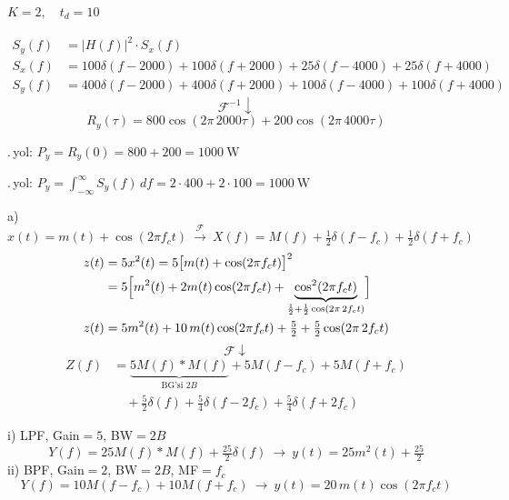 \documentclass[11pt,a4paper]{article}
\begin{document}
\noindent $K=2,\quad t_d=10$

\noindent
{}
\begin{align*}
S_y(f)&=|H(f)|^2\cdot S_x(f)\\
S_x(f)&=100\delta(f-2000)+100\delta(f+2000)+25\delta(f-4000)+25\delta(f+4000)\\
S_y(f)&=400\delta(f-2000)+400\delta(f+2000)+100\delta(f-4000)+100\delta(f+4000)
\end{align*}
\[ \mathcal{F}^{-1}\downarrow \]
\[ R_y(\tau)=800\cos(2\pi\,2000\tau)+200\cos(2\pi\,4000\tau) \]

.\,yol: $P_y=R_y(0)=800+200=1000\ \mathrm{W}$

.\,yol: $P_y=\displaystyle\int_{-\infty}^{\infty}S_y(f)\,df=2\cdot400+2\cdot100=1000\ \mathrm{W}$


\noindent a)
\[
x(t)=m(t)+\cos(2\pi f_c t)\ \xrightarrow{\ \mathcal{F}\ }\ X(f)=M(f)+\tfrac12\delta(f-f_c)+\tfrac12\delta(f+f_c)
\]
\begin{align*}
z(t)&=5x^2(t)=5\bigl[m(t)+\cos(2\pi f_c t)\bigr]^2\\
 &=5\Bigl[m^2(t)+2m(t)\cos(2\pi f_c t)+\underbrace{\cos^2(2\pi f_c t)}_{\frac12+\frac12\cos(2\pi\,2f_c t)}\Bigr]\\
z(t)&=5m^2(t)+10\,m(t)\cos(2\pi f_c t)+\tfrac52+\tfrac52\cos(2\pi\,2f_c t)
\end{align*}
\[ \mathcal{F}\downarrow \]
\begin{align*}
Z(f)&=\underbrace{5M(f)\ast M(f)}_{\text{BG'si } 2B}+5M(f-f_c)+5M(f+f_c)\\
 &\quad+\tfrac52\delta(f)+\tfrac54\delta(f-2f_c)+\tfrac54\delta(f+2f_c)
\end{align*}

\noindent i) LPF, Gain$=5$, BW$=2B$
\[
Y(f)=25M(f)\ast M(f)+\tfrac{25}{2}\delta(f)\ \longrightarrow\ y(t)=25m^2(t)+\tfrac{25}{2}
\]
\noindent ii) BPF, Gain$=2$, BW$=2B$, MF$=f_c$
\[
Y(f)=10M(f-f_c)+10M(f+f_c)\ \longrightarrow\ y(t)=20\,m(t)\cos(2\pi f_c t)
\]
\end{document}
